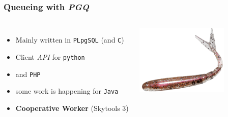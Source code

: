 \documentclass[english]{beamer}
\begin{document}
\begin{frame}[fragile]
  \frametitle{Queueing with \textit{PGQ}}

  \vfill

\begin{columns}[c]

  \begin{itemize}
   \item<1-> Mainly written in \texttt{PLpgSQL} (and \texttt{C})
   \item<1-> Client \textit{API} for \texttt{python}
   \item<1-> and \texttt{PHP}
   \item<2-> some work is happening for \texttt{Java}
   \item<3-> \textbf{Cooperative Worker} (Skytools 3)
  \end{itemize}  


\includegraphics[height=9em]{drop-queue.png}
\end{columns}
\end{frame}
\end{document}
